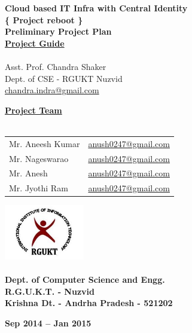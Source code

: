\documentclass[12pt]{report}
\begin{document}
\begin{titlepage}
 \begin{center}
\LARGE
\textbf{Cloud based IT Infra with Central Identity} \\
\vfill
\large
\textbf{\{ Project reboot \}}\\
\vfill
\textbf{Preliminary Project Plan }\\
\vfill
\Large
\underline{\textbf{Project Guide }} \\ 
\large
\underline{} \\
Asst. Prof. Chandra Shaker \\
\normalsize
Dept. of CSE - RGUKT Nuzvid \\
\url{chandra.indra@gmail.com}
\vfill

\Large
\textbf{\underline{ Project Team } } \\
\underline{} \\
\large
\begin{tabular}{l l}
Mr. Aneesh Kumar & \normalsize \url{anush0247@gmail.com} \\
Mr. Nageswarao  & \normalsize \url{anush0247@gmail.com} \\
Mr. Anesh  & \normalsize \url{anush0247@gmail.com} \\
Mr. Jyothi Ram & \normalsize \url{anush0247@gmail.com} 
\end{tabular}

\vfill


\includegraphics[width=3.5cm]{rgukt_logo.jpg} 
\Large
\underline{} \\
\underline{} \\
\normalsize
\textbf{Dept. of Computer Science and Engg. } \\
\textbf{R.G.U.K.T. - Nuzvid } \\
\textbf{Krishna Dt. - Andrha Pradesh - 521202}


\normalsize
\vfill
%
%

\textbf{Sep 2014 -- Jan 2015 }

\end{center}
\end{titlepage}
\end{document}
